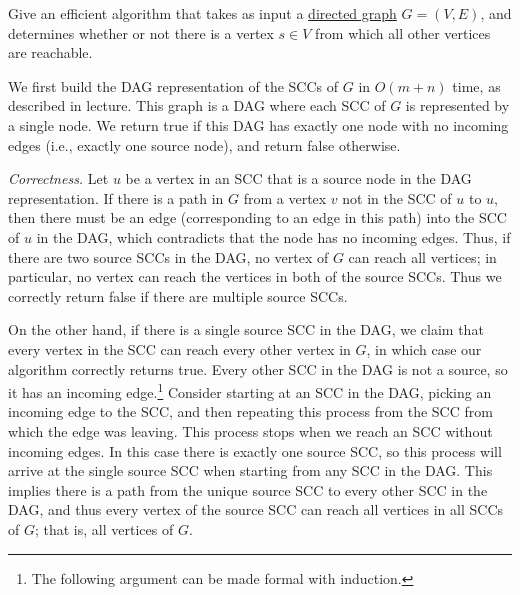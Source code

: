  \begin{exercise}[DPV 3.22] 
    Give an efficient algorithm that takes as input a \hyperref[def:directed-graph]{directed graph} $G = (V,E)$, and determines whether or not there is a vertex $s \in V$ from which all other vertices are reachable.
  \end{exercise}
  \begin{solution}
    We first build the DAG representation of the SCCs of $G$ in $O(m+n)$ time, as described in lecture. This graph is a DAG where each SCC of $G$ is represented by a single node. We return true if this DAG has exactly one node with no incoming edges (i.e., exactly one source node), and return false otherwise.

    \textit{Correctness.} Let $u$ be a vertex in an SCC that is a source node in the DAG representation. If there is a path in $G$ from a vertex $v$ not in the SCC of $u$ to $u$, then there must be an edge (corresponding to an edge in this path) into the SCC of $u$ in the DAG, which contradicts that the node has no incoming edges. Thus, if there are two source SCCs in the DAG, no vertex of $G$ can reach all vertices; in particular, no vertex can reach the vertices in both of the source SCCs. Thus we correctly return false if there are multiple source SCCs. 
    
    On the other hand, if there is a single source SCC in the DAG, we claim that every vertex in the SCC can reach every other vertex in $G$, in which case our algorithm correctly returns true. Every other SCC in the DAG is not a source, so it has an incoming edge.\footnote{The following argument can be made formal with induction.} Consider starting at an SCC in the DAG, picking an incoming edge to the SCC, and then repeating this process from the SCC from which the edge was leaving. This process stops when we reach an SCC without incoming edges. In this case there is exactly one source SCC, so this process will arrive at the single source SCC when starting from any SCC in the DAG. This implies there is a path from the unique source SCC to every other SCC in the DAG, and thus every vertex of the source SCC can reach all vertices in all SCCs of $G$; that is, all vertices of $G$.
  \end{solution}

